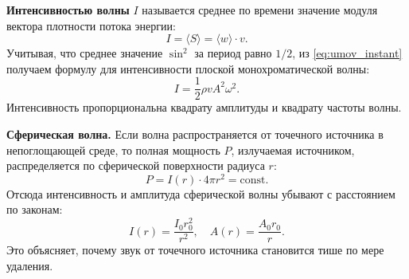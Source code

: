 \begin{definition}
\textbf{Интенсивностью волны} $I$ называется среднее по времени значение модуля вектора плотности потока энергии:
\begin{equation}
    I = \langle S \rangle = \langle w \rangle \cdot v.
\end{equation}
Учитывая, что среднее значение $\sin^2$ за период равно $1/2$, из \eqref{eq:umov_instant} получаем формулу для интенсивности плоской монохроматической волны:
\begin{equation}
    I = \frac{1}{2} \rho v A^2 \omega^2. \label{eq:intensity_plane}
\end{equation}
Интенсивность пропорциональна квадрату амплитуды и квадрату частоты волны.
\end{definition}

\begin{remark}
\textbf{Сферическая волна.} Если волна распространяется от точечного источника в непоглощающей среде, то полная мощность $P$, излучаемая источником, распределяется по сферической поверхности радиуса $r$:
\begin{equation}
    P = I(r) \cdot 4\pi r^2 = \text{const}.
\end{equation}
Отсюда интенсивность и амплитуда сферической волны убывают с расстоянием по законам:
\begin{equation}
    I(r) = \frac{I_0 r_0^2}{r^2}, \quad A(r) = \frac{A_0 r_0}{r}. \label{eq:spherical_decay}
\end{equation}
Это объясняет, почему звук от точечного источника становится тише по мере удаления.
\end{remark}
